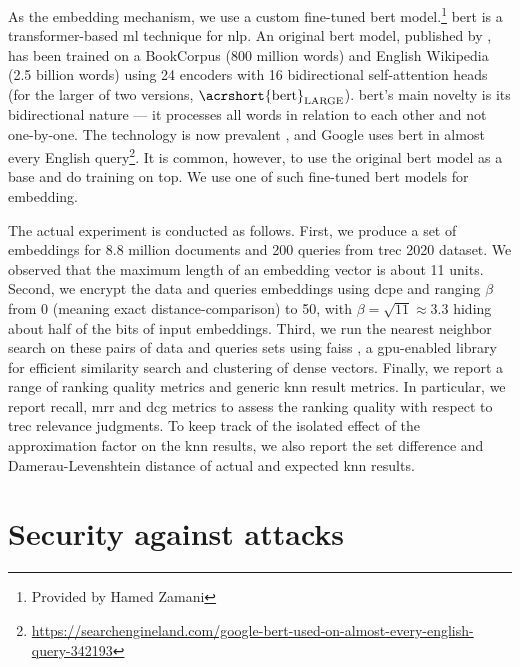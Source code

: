 		As the embedding mechanism, we use a custom fine-tuned \acrshort{bert} model.\footnote{Provided by Hamed Zamani}
		\acrfull{bert} is a transformer-based \acrshort{ml} technique for \acrlong{nlp}.
		An original \acrshort{bert} model, published by \textcite{bert}, has been trained on a BookCorpus \cite{bookcorpus} (800 million words) and English Wikipedia (2.5 billion words) using 24 encoders with 16 bidirectional self-attention heads (for the larger of two versions, $\text{\acrshort{bert}}_\text{LARGE}$).
		\acrshort{bert}'s main novelty is its bidirectional nature --- it processes all words in relation to each other and not one-by-one.
		The technology is now prevalent \cite{bert-is-prevalent}, and Google uses \acrshort{bert} in almost every English query\footnote{
			\url{https://searchengineland.com/google-bert-used-on-almost-every-english-query-342193}
		}.
		It is common, however, to use the original \acrshort{bert} model as a base and do training on top.
		{\color{red}We use one of such fine-tuned \acrshort{bert} models for embedding.}

		The actual experiment is conducted as follows.
		First, we produce a set of embeddings for 8.8 million documents and 200 queries from \acrshort{trec} 2020 dataset.
		We observed that the maximum length of an embedding vector is about 11 units.
		Second, we encrypt the data and queries embeddings using \acrshort{dcpe} and ranging $\beta$ from 0 (meaning exact distance-comparison) to 50, with $\beta = \sqrt{11} \approx 3.3$ hiding about half of the bits of input embeddings.
		Third, we run the nearest neighbor search on these pairs of data and queries sets using \acrshort{faiss} \cite{faiss}, a \acrshort{gpu}-enabled library for efficient similarity search and clustering of dense vectors.
		Finally, we report a range of ranking quality metrics and generic \acrshort{knn} result metrics.
		In particular, we report recall, \acrfull{mrr} \cite{mrr} and \acrfull{dcg} \cite{dcg} metrics to assess the ranking quality with respect to \acrshort{trec} relevance judgments.
		To keep track of the isolated effect of the approximation factor on the \acrshort{knn} results, we also report the set difference and Damerau-Levenshtein distance \cite{levenshtein-distance,damerau-distance} of actual and expected \acrshort{knn} results.

		
		

	\section{Security against attacks}
